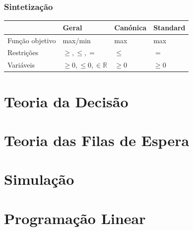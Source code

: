\documentclass[]{report}
\begin{document}
\subsection{Sintetização}
\begin{table}[ht!]
\begin{tabular}{l|l|l|l}
                & Geral           & Canónica & Standard \\\hline
Função objetivo & max/min         & max      & max \\\hline
Restrições      & $\geq,\leq, =$  & $\leq$   & $=$\\\hline
Variáveis       & $\geq 0,\leq 0,\in \mathbb{R}$ & $\geq 0$ & $\geq 0$         
\end{tabular}
\end{table}
\chapter{Teoria da Decisão}
\chapter{Teoria das Filas de Espera}
\chapter{Simulação}
\chapter{Programação Linear}
\end{document}
